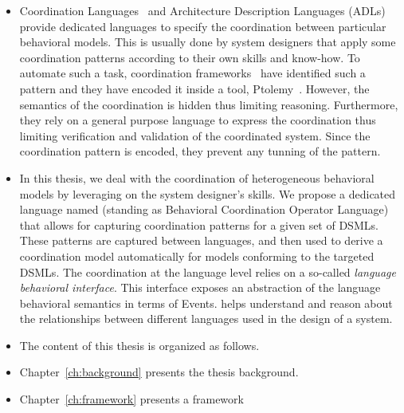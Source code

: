 \begin{itemize}
	\item Coordination Languages~\cite{coordsignibib} and Architecture Description Languages (ADLs)~\cite{frameadlsbib} provide dedicated languages to specify the coordination between particular behavioral models. This is usually done by system designers that apply some coordination patterns according to their own skills and know-how. To automate such a task, coordination frameworks~\cite{ptoleframebib,modhelxbib} have identified such a pattern and they have encoded it inside a tool, \eg Ptolemy~\cite{ptoleframebib}. However, the semantics of the coordination is hidden thus limiting reasoning. Furthermore, they rely on a general purpose language to express the coordination thus limiting verification and validation of the coordinated system. Since the coordination pattern is encoded, they prevent any tunning of the pattern.   
	
\item In this thesis, we deal with the coordination of heterogeneous behavioral models by leveraging on the system designer's skills. We propose a dedicated language named \bcool (standing as Behavioral Coordination Operator Language) that allows for capturing coordination patterns for a given set of DSMLs. These patterns are captured between languages, and then used to derive a coordination model automatically for models conforming to the targeted DSMLs. The coordination at the language level relies on a so-called \emph{language behavioral interface}. This interface exposes an abstraction of the language behavioral semantics in terms of Events. \bcool helps understand and reason about the relationships between different languages used in the design of a system. 

\item The content of this thesis is organized as follows. 

\item Chapter~\ref{ch:background} presents the thesis background.

\item Chapter~\ref{ch:framework} presents a framework 


	

\end{itemize}
